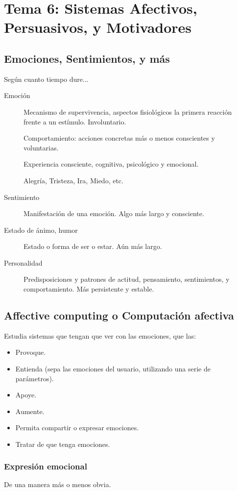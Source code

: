 \documentclass[12pt]{report} %
\begin{document}
\chapter{Tema 6: Sistemas Afectivos, Persuasivos, y Motivadores}

\section{Emociones, Sentimientos, y más}
Según cuanto tiempo dure...
\begin{description}
  \item[Emoción] Mecanismo de supervivencia, aspectos fisiológicos la primera reacción frente a un estímulo. Involuntario.
  
  Comportamiento: acciones concretas más o menos conscientes y voluntarias.

  Experiencia consciente, cognitiva, psicológico y emocional.

  Alegría, Tristeza, Ira, Miedo, etc. 
  \item[Sentimiento] Manifestación de una emoción. Algo más largo y consciente.
  \item[Estado de ánimo, humor] Estado o forma de ser o estar. Aún más largo.
  \item[Personalidad] Predisposiciones y patrones de actitud, pensamiento, sentimientos, y comportamiento. Más persistente y estable.
\end{description}
  

\section{Affective computing o Computación afectiva}
Estudia sistemas que tengan que ver con las emociones, que las:
\begin{itemize}
  \item Provoque.
  \item Entienda (sepa las emociones del usuario, utilizando una serie de parámetros).
  \item Apoye.
  \item Aumente.
  \item Permita compartir o expresar emociones.
  \item Tratar de que tenga emociones.
\end{itemize}

\subsection{Expresión emocional}
De una manera más o menos obvia. 
\end{document}
